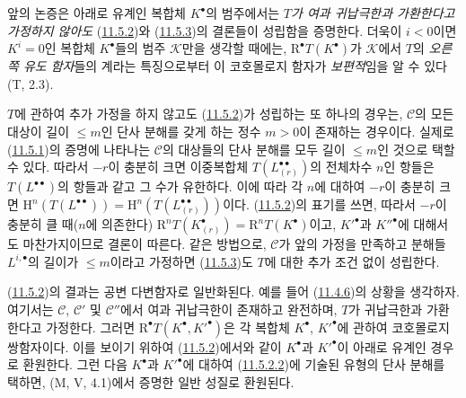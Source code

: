 \begin{remark}[11.5.4]
\label{0.11.5.4-ko}
앞의 논증은 아래로 유계인 복합체 $K^\bullet$의 범주에서는
\emph{$T$가 여과 귀납극한과 가환한다고 가정하지 않아도}
(\hyperref[0.11.5.2-ko]{11.5.2})와
(\hyperref[0.11.5.3-ko]{11.5.3})의 결론들이 성립함을 증명한다.
더욱이 $i<0$이면 $K^i=0$인 복합체 $K^\bullet$들의 범주
$\mathcal K$만을 생각할 때에는, $\mathrm R^\bullet T(K^\bullet)$가
$\mathcal K$에서 $T$의 \emph{오른쪽 유도 함자}들의 계라는 특징으로부터
이 코호몰로지 함자가 \emph{보편적}임을 알 수 있다(T, 2.3).

$T$에 관하여 추가 가정을 하지 않고도
(\hyperref[0.11.5.2-ko]{11.5.2})가 성립하는 또 하나의 경우는,
$\mathcal C$의 모든 대상이 길이 $\leq m$인 단사 분해를 갖게 하는
정수 $m>0$이 존재하는 경우이다. 실제로
(\hyperref[0.11.5.1-ko]{11.5.1})의 증명에 나타나는
$\mathcal C$의 대상들의 단사 분해를 모두 길이 $\leq m$인 것으로
택할 수 있다. 따라서 $-r$이 충분히 크면 이중복합체
$T(L_{(r)}^{\bullet\bullet})$의 전체차수 $n$인 항들은
$T(L^{\bullet\bullet})$의 항들과 같고 그 수가 유한하다. 이에 따라
각 $n$에 대하여 $-r$이 충분히 크면
$\mathrm H^n(T(L^{\bullet\bullet}))=
\mathrm H^n(T(L_{(r)}^{\bullet\bullet}))$이다.
(\hyperref[0.11.5.2-ko]{11.5.2})의 표기를 쓰면, 따라서 $-r$이 충분히
클 때($n$에 의존한다)
$\mathrm R^nT(K_{(r)}^\bullet)=\mathrm R^nT(K^\bullet)$이고,
$K'^\bullet$과 $K''^\bullet$에 대해서도 마찬가지이므로 결론이 따른다.
같은 방법으로, $\mathcal C$가 앞의 가정을 만족하고 분해들
$L^{i,\bullet}$의 길이가 $\leq m$이라고 가정하면
(\hyperref[0.11.5.3-ko]{11.5.3})도 $T$에 대한 추가 조건 없이
성립한다.
\end{remark}

\begin{env}[11.5.5]
\label{0.11.5.5-ko}
(\hyperref[0.11.5.2-ko]{11.5.2})의 결과는 공변 다변함자로
일반화된다. 예를 들어 (\hyperref[0.11.4.6-fr]{11.4.6})의 상황을
생각하자. 여기서는 $\mathcal C$, $\mathcal C'$ 및 $\mathcal C''$에서
여과 귀납극한이 존재하고 완전하며, $T$가 귀납극한과 가환한다고
가정한다. 그러면 $\mathrm R^\bullet T(K^\bullet,K'^\bullet)$은
각 복합체 $K^\bullet$, $K'^\bullet$에 관하여 코호몰로지 쌍함자이다.
이를 보이기 위하여 (\hyperref[0.11.5.2-ko]{11.5.2})에서와 같이
$K^\bullet$과 $K'^\bullet$이 아래로 유계인 경우로 환원한다. 그런 다음
$K^\bullet$과 $K'^\bullet$에 대하여
(\hyperref[0.11.5.2.2-ko]{11.5.2.2})에 기술된 유형의 단사 분해를
택하면, (M, V, 4.1)에서 증명한 일반 성질로 환원된다.
\end{env}

